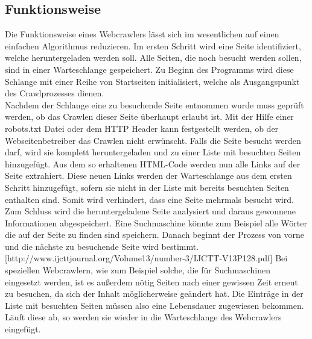 \subsection{Funktionsweise}
Die Funktionsweise eines Webcrawlers lässt sich im wesentlichen auf einen einfachen Algorithmus reduzieren. Im ersten Schritt wird eine Seite identifiziert, welche heruntergeladen werden soll. Alle Seiten, die noch besucht werden sollen, sind in einer Warteschlange gespeichert. Zu Beginn des Programms wird diese Schlange mit einer Reihe von Startseiten initialisiert, welche als Ausgangspunkt des Crawlprozesses dienen.\\
Nachdem der Schlange eine zu besuchende Seite entnommen wurde muss geprüft werden, ob das Crawlen dieser Seite überhaupt erlaubt ist. Mit der Hilfe einer robots.txt Datei oder dem HTTP Header kann festgestellt werden, ob der Webseitenbetreiber das Crawlen nicht erwünscht.
Falls die Seite besucht werden darf, wird sie komplett heruntergeladen und zu einer Liste mit besuchten Seiten hinzugefügt. Aus dem so erhaltenen HTML-Code werden nun alle Links auf der Seite extrahiert. Diese neuen Links werden der Warteschlange aus dem ersten Schritt hinzugefügt, sofern sie nicht in der Liste mit bereits besuchten Seiten enthalten sind. Somit wird verhindert, dass eine Seite mehrmals besucht wird. \\
Zum Schluss wird die heruntergeladene Seite analysiert und daraus gewonnene Informationen abgespeichert. Eine Suchmaschine könnte zum Beispiel alle Wörter die auf der Seite zu finden sind speichern. Danach beginnt der Prozess von vorne und die nächste zu besuchende Seite wird bestimmt. [http://www.ijcttjournal.org/Volume13/number-3/IJCTT-V13P128.pdf]
Bei speziellen Webcrawlern, wie zum Beispiel solche, die für Suchmaschinen eingesetzt werden, ist es außerdem nötig Seiten nach einer gewissen Zeit erneut zu besuchen, da sich der Inhalt möglicherweise geändert hat. Die Einträge in der Liste mit besuchten Seiten müssen also eine Lebensdauer zugewiesen bekommen. Läuft diese ab, so werden sie wieder in die Warteschlange des Webcrawlers eingefügt.
